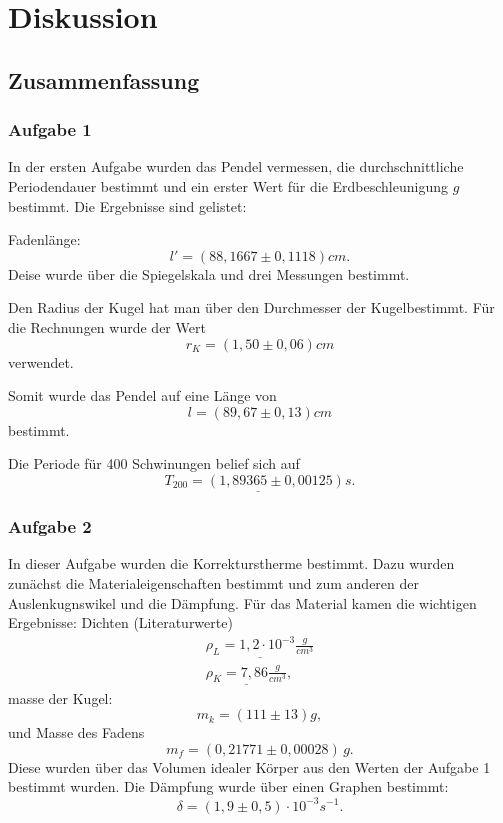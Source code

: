 \chapter{Diskussion}
\label{ch:diskussion}

\section{Zusammenfassung}
\subsection*{Aufgabe 1}
In der ersten Aufgabe wurden das Pendel vermessen, die durchschnittliche Periodendauer bestimmt und ein erster Wert für die Erdbeschleunigung $g$ bestimmt. Die Ergebnisse sind gelistet:

Fadenlänge:
\begin{equation}
    \boxed{
        l' = (88,1667 \pm 0,1118) cm
    }.
\end{equation}
Deise wurde über die Spiegelskala und drei Messungen bestimmt.

Den Radius der Kugel hat man über den Durchmesser der Kugelbestimmt. Für die Rechnungen wurde der Wert
\begin{equation}
    \boxed{
        r_K = (1,50 \pm 0,06)cm
    }
\end{equation}
verwendet. 

Somit wurde das Pendel auf eine Länge von 
\begin{equation}
\boxed{
    l = (89,67 \pm 0,13)cm
}
\end{equation}
bestimmt.

Die Periode für 400 Schwinungen belief sich auf 
\begin{equation}
    \underline{
        T_{200} = (1,89365 \pm 0,00125)s
    }.
\end{equation}

\subsection*{Aufgabe 2}
In dieser Aufgabe wurden die Korrekturstherme bestimmt. Dazu wurden zunächst die Materialeigenschaften bestimmt und zum anderen der Auslenkugnswikel und die Dämpfung. Für das Material kamen die wichtigen Ergebnisse:
Dichten (Literaturwerte)
\begin{align}
    \underline{\rho_L = 1,2 \cdot 10^{-3} \frac{g}{cm^3}} \\
    \underline{\rho_K = 7,86 \frac{g}{cm^3}},
\end{align}
masse der Kugel:
\begin{equation}
    \boxed{
        m_k = (111 \pm 13) g
    },
\end{equation}
und Masse des Fadens
\begin{equation}
    \boxed{
        m_f = (0,21771 \pm 0,00028) \, g
    }.
\end{equation}
Diese wurden über das Volumen idealer Körper aus den Werten der Aufgabe 1 bestimmt wurden. 
Die Dämpfung wurde über einen Graphen bestimmt:
\begin{equation}
\boxed{
    \delta = (1,9 \pm 0,5) \cdot 10^{-3} s^{-1}
}.
\end{equation}


